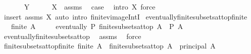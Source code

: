 \begin{isabellebody}
\ \ \ \ \isamarkupfalse%
\ {\isacharparenleft}{\kern0pt}{}\ Y{\isacharparenright}{\kern0pt}\isanewline
\ \ \ \ \isamarkupfalse%
\ X{\isacharparenleft}{\kern0pt}{}{\isacharcomma}{\kern0pt}{}{\isacharparenright}{\kern0pt}\ \ assms\ \isamarkupfalse%
\ {\isacharquery}{\kern0pt}case\ \isamarkupfalse%
\ {\isacharparenleft}{\kern0pt}intro\ X{\isacharparenleft}{\kern0pt}{}{\isacharparenright}{\kern0pt}{\isacharparenright}{\kern0pt}\ force{\isacharplus}{\kern0pt}\isanewline
\ \ \isamarkupfalse%
\ {\isacharparenleft}{\kern0pt}insert\ assms\ X{\isacharparenleft}{\kern0pt}{}{\isacharparenright}{\kern0pt}{\isacharcomma}{\kern0pt}\ auto\ intro{\isacharbang}{\kern0pt}{\isacharcolon}{\kern0pt}\ finite{\isacharunderscore}{\kern0pt}vimage{\isacharunderscore}{\kern0pt}IntI{\isacharparenright}{\kern0pt}\isanewline
{}\isamarkupfalse%
%
\endisatagproof
{\isafoldproof}%
%
\isadelimproof
\isanewline
%
\endisadelimproof
\isanewline
{}\isamarkupfalse%
\ eventually{\isacharunderscore}{\kern0pt}finite{\isacharunderscore}{\kern0pt}subsets{\isacharunderscore}{\kern0pt}at{\isacharunderscore}{\kern0pt}top{\isacharunderscore}{\kern0pt}finite{\isacharcolon}{\kern0pt}\isanewline
\ \ \ {\isachardoublequoteopen}finite\ A{\isachardoublequoteclose}\isanewline
\ \ \ \ \ {\isachardoublequoteopen}eventually\ P\ {\isacharparenleft}{\kern0pt}finite{\isacharunderscore}{\kern0pt}subsets{\isacharunderscore}{\kern0pt}at{\isacharunderscore}{\kern0pt}top\ A{\isacharparenright}{\kern0pt}\ {\isasymlongleftrightarrow}\ P\ A{\isachardoublequoteclose}\isanewline
%
\isadelimproof
\ \ %
\endisadelimproof
%
\isatagproof
{}\isamarkupfalse%
\ eventually{\isacharunderscore}{\kern0pt}finite{\isacharunderscore}{\kern0pt}subsets{\isacharunderscore}{\kern0pt}at{\isacharunderscore}{\kern0pt}top\ \isamarkupfalse%
\ assms\ \isamarkupfalse%
\ force%
\endisatagproof
{\isafoldproof}%
%
\isadelimproof
\isanewline
%
\endisadelimproof
\isanewline
{}\isamarkupfalse%
\ finite{\isacharunderscore}{\kern0pt}subsets{\isacharunderscore}{\kern0pt}at{\isacharunderscore}{\kern0pt}top{\isacharunderscore}{\kern0pt}finite{\isacharcolon}{\kern0pt}\ {\isachardoublequoteopen}finite\ A\ {\isasymLongrightarrow}\ finite{\isacharunderscore}{\kern0pt}subsets{\isacharunderscore}{\kern0pt}at{\isacharunderscore}{\kern0pt}top\ A\ {\isacharequal}{\kern0pt}\ principal\ {\isacharbraceleft}{\kern0pt}A{\isacharbraceright}{\kern0pt}{\isachardoublequoteclose}\isanewline

\end{isabellebody}
